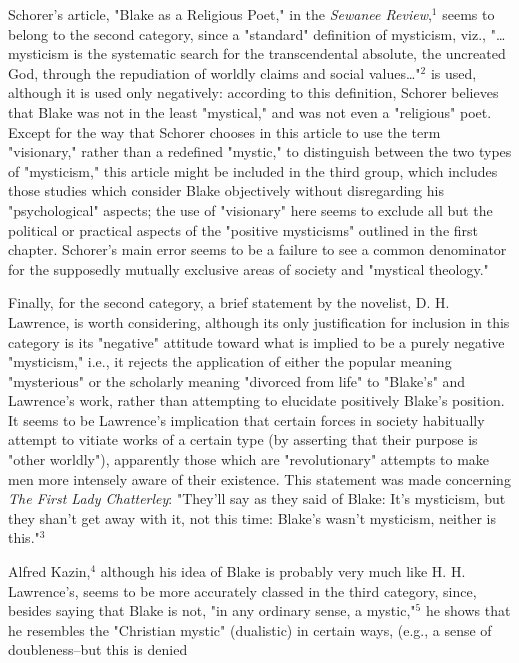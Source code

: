 Schorer's article, "Blake as a Religious Poet," in the \textit{Sewanee Review},$^{1}$ seems to belong to the second category,
since a "standard" definition of mysticism, viz., "\dots mysticism is the systematic search for
the transcendental absolute, the uncreated God, through the repudiation of worldly claims and
social values\dots"$^{2}$ is used, although it is used only negatively: according to this definition, Schorer
believes that Blake was not in the least "mystical," and was not even a "religious" poet. Except for the way that Schorer chooses
in this article to use the term "visionary," rather than a redefined "mystic," to distinguish between the two types of
"mysticism," this article might be included in the third group, which includes those studies which consider Blake objectively
without disregarding his "psychological" aspects; the use of "visionary" here seems to exclude all but the political or
practical aspects of the "positive mysticisms" outlined in the first chapter. Schorer's main error seems to be a failure
to see a common denominator for the supposedly mutually exclusive areas of society and "mystical theology."\par
\vspace*{0.5\baselineskip}
Finally, for the second category, a brief statement by the novelist, D. H. Lawrence, is worth
considering, although its only justification for inclusion in this category is its "negative" attitude toward what is
implied to be a purely negative "mysticism," i.e., it rejects the application of either the popular meaning "mysterious" or the
scholarly meaning "divorced from life" to "Blake's" and Lawrence's work, rather
than attempting to elucidate positively Blake's position. It seems to be Lawrence's implication that certain
forces in society habitually attempt to vitiate works of a certain type (by asserting that their purpose is "other worldly"), apparently
those which are "revolutionary" attempts to make men more intensely aware of their existence. This statement was made concerning
\textit{The First Lady Chatterley}: "They'll say as they said of Blake: It's mysticism, but they shan't get away with it, not this time: Blake's
wasn't mysticism, neither is this."$^{3}$\par
\vspace*{0.5\baselineskip}
Alfred Kazin,$^{4}$ although his idea of Blake is probably very much like H. H. Lawrence's, seems to be more accurately
classed in the third category, since, besides saying that Blake is not, "in any ordinary sense, a mystic,"$^{5}$ he shows
that he resembles the "Christian mystic" (dualistic) in certain ways, (e.g., a sense of doubleness--but this is denied

